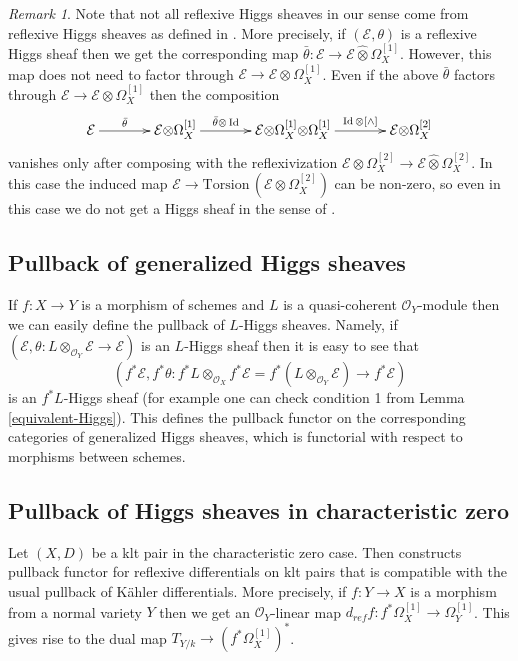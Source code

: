 \documentclass[12pt]{article}
\theoremstyle{plain}
\theoremstyle{definition}
\theoremstyle{remark}
\newtheorem{Remark}[Thm]{Remark}
\newcommand{\cE}{{\mathcal E}}
\newcommand{\cO}{{\mathcal O}}
\newcommand{\id}{\mathop{\rm Id}}
\begin{document}
\medskip

\begin{Remark}
Note that not all reflexive Higgs sheaves in our sense come from reflexive Higgs sheaves as defined in \cite{GKPT2}. More precisely, if $(\cE, \theta)$ is a reflexive  Higgs sheaf then we get the corresponding map $\bar\theta: \cE\to \cE\hat{\otimes} \Omega_X^{[1]}$. However, this map does not need to factor through  $\cE\to \cE{\otimes} \Omega_X^{[1]}$. Even if the above $\bar\theta$ factors through
$\cE\to \cE{\otimes} \Omega_X^{[1]}$ then the composition 
$$\xymatrixcolsep{3pc}\xymatrix{
	\cE\ar[r]^-{\bar\theta}& \cE{\otimes} \Omega_X^{[1]}\ar[r]^-{\bar\theta{\otimes }\id}&
	\cE{\otimes} \Omega_X^{[1]}{\otimes} \Omega_X^{[1]}\ar[r]^-{\id {\otimes}[\wedge]}&
	\cE{\otimes} \Omega_X^{[2]}\\
}
$$
vanishes only after composing with the reflexivization $\cE{\otimes} \Omega_X^{[2]}\to \cE \hat{\otimes} \Omega_X^{[2]}$. In this case the induced map $\cE\to {\mathrm{Torsion}}\,(\cE{\otimes} \Omega_X^{[2]})$
can be non-zero, so even in this case we do not get  a Higgs sheaf in the sense of 
\cite[Definition 5.1]{GKPT2}.
\end{Remark}



\subsection{Pullback of generalized Higgs sheaves}\label{pullback-general}

If $f:X\to Y$ is a morphism of schemes and $L$ is a quasi-coherent $\cO_Y$-module then we can easily define the pullback of $L$-Higgs sheaves. Namely, if  $(\cE , \theta : L\otimes _{\cO_Y} \cE\to \cE)$ is an $L$-Higgs sheaf then it is easy to see that
 $$(f^*\cE , f^*\theta : f^*L\otimes _{\cO_X} f^*\cE= f^*(L\otimes _{\cO_Y} \cE)\to f^* \cE)$$
is an $f^*L$-Higgs sheaf (for example one can check condition 1 from Lemma \ref{equivalent-Higgs}). This defines the pullback functor on the corresponding categories of generalized Higgs sheaves, which is functorial with respect to morphisms between schemes.




\subsection{Pullback of Higgs sheaves in characteristic zero}\label{pullback-char-0}

Let $(X, D)$ be a klt pair in the characteristic zero case. Then \cite[Theorems 1.3 and 5.2]{Ke} constructs pullback functor for reflexive differentials on klt pairs that is compatible with the usual pullback of K\"ahler differentials. More precisely, if $f: Y\to X$ is a morphism from a normal variety $Y$ then we get an $\cO_Y$-linear map $d_{ref} f: f^*\Omega_X^{[1]}\to \Omega_Y^{[1]}$. This gives rise to the dual map $T_{Y/k}\to ( f^*\Omega_X^{[1]})^*$. 
\end{document}
